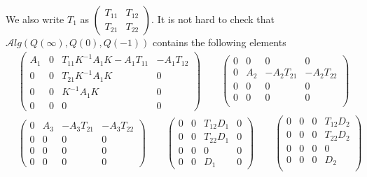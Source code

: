 \documentclass[a4paper,10pt]{amsart}
\newcommand{\Alg}{\mathcal Alg}
\begin{document}
We also write $T_1$ as
$\begin{pmatrix}
       T_{11} & T_{12} \\
       T_{21} & T_{22}
\end{pmatrix}$. 
It is not hard to check that $\Alg(Q(\infty), Q(0), Q(-1))$ contains the
following elements 
\begin{align*}
    &\begin{pmatrix}
    A_1 & 0 & T_{11}K^{-1}A_{1}K-A_{1}T_{11}& -A_{1}T_{12}\\
       0 & 0 & T_{21}K^{-1}A_{1}K & 0\\
       0 & 0 & K^{-1}A_{1}K & 0 \\
       0 & 0 & 0 & 0
   \end{pmatrix} \qquad  
   \begin{pmatrix}
   0 & 0 & 0 & 0\\ 
   0 & A_{2} & -A_{2}T_{21} & -A_{2}T_{22} \\
   0 & 0 & 0 & 0\\ 
   0 & 0 & 0 & 0\\ 
   \end{pmatrix}\\
   &\begin{pmatrix}
   0 & A_{3} & -A_{3}T_{21} & -A_{3}T_{22}\\ 
   0 & 0 & 0 & 0 \\
   0 & 0 & 0 & 0\\ 
   0 & 0 & 0 & 0 
   \end{pmatrix} \qquad
   \begin{pmatrix}
   0 & 0 & T_{12}D_{1} & 0\\ 
   0 & 0 & T_{22}D_{1} & 0 \\
   0 & 0 & 0 & 0\\ 
   0 & 0 & D_{1} & 0 
   \end{pmatrix} \qquad
   \begin{pmatrix}
   0 & 0 & 0 & T_{12}D_{2}\\ 
   0 & 0 & 0 & T_{22}D_{2} \\
   0 & 0 & 0 & 0\\ 
   0 & 0 & 0 & D_{2}\\ 
   \end{pmatrix}
\end{align*}
\end{document}
